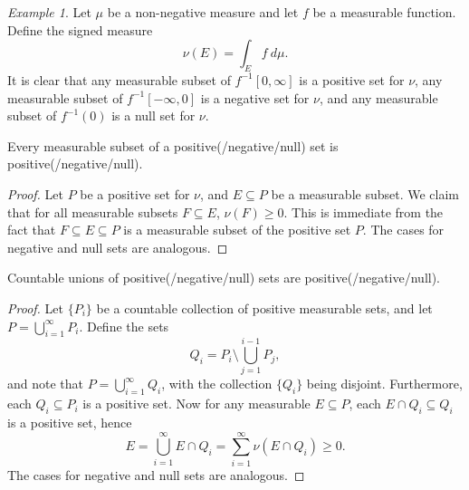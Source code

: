 \documentclass[11pt]{article}
\theoremstyle{definition}
\theoremstyle{remark}
\newtheorem*{example}{Example}
\begin{document}
    \begin{example}
        Let $\mu$ be a non-negative measure and let $f$ be a measurable function.
        Define the signed measure \[
            \nu(E) = \int_E f\:d\mu.
        \] It is clear that any measurable subset of $f^{-1}[0, \infty]$ is a
        positive set for $\nu$, any measurable subset of $f^{-1}[-\infty, 0]$ is a
        negative set for $\nu$, and any measurable subset of $f^{-1}(0)$ is a null
        set for $\nu$.
    \end{example}

    \begin{lemma}
        Every measurable subset of a positive(/negative/null) set is
        positive(/negative/null).
    \end{lemma}
    \begin{proof}
        Let $P$ be a positive set for $\nu$, and $E \subseteq P$ be a measurable
        subset. We claim that for all measurable subsets $F \subseteq E$, $\nu(F)
        \geq 0$. This is immediate from the fact that $F \subseteq E \subseteq P$ is
        a measurable subset of the positive set $P$. The cases for negative and null
        sets are analogous.
    \end{proof}

    \begin{lemma}
        Countable unions of positive(/negative/null) sets are
        positive(/negative/null).
    \end{lemma}
    \begin{proof}
        Let $\{P_i\}$ be a countable collection of positive measurable sets, and let
        $P = \bigcup_{i = 1}^\infty P_i$. Define the sets \[
            Q_i = P_i \setminus \bigcup_{j = 1}^{i - 1} P_j,
        \] and note that $P = \bigcup_{i = 1}^\infty Q_i$, with the collection
        $\{Q_i\}$ being disjoint. Furthermore, each $Q_i \subseteq P_i$ is a positive
        set. Now for any measurable $E \subseteq P$, each $E \cap Q_i \subseteq Q_i$
        is a positive set, hence \[
            E = \bigcup_{i = 1}^\infty E \cap Q_i = \sum_{i = 1}^\infty \nu(E \cap
            Q_i) \geq 0.
        \] The cases for negative and null sets are analogous.
    \end{proof}
\end{document}
